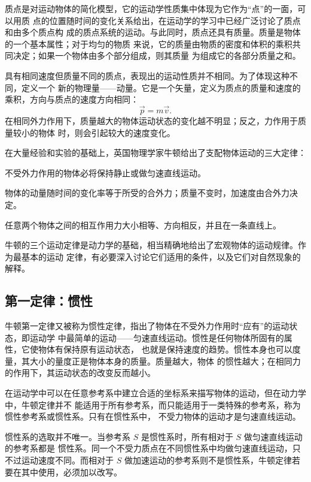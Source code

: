 {质点是对运动物体的简化模型，它的运动学性质集中体现为它作为“点”的一面，可以用质
点的位置随时间的变化关系给出，在运动学的学习中已经广泛讨论了质点和由多个质点构
成的质点系统的运动。与此同时，质点还具有质量。质量是物体的一个基本属性；对于均匀的物质
来说，它的质量由物质的密度和体积的乘积共同决定；如果一个物体由多个部分组成，则其质量
为组成它的各部分质量之和。

具有相同速度但质量不同的质点，表现出的运动性质并不相同。为了体现这种不同，定义一个
新的物理量——动量。它是一个矢量，定义为质点的质量和速度的乘积，方向与质点的速度方向相同：
\begin{equation}
  \vec p=m\vec v.
\end{equation}
在相同外力作用下，质量越大的物体运动状态的变化越不明显；反之，力作用于质量较小的物体
时，则会引起较大的速度变化。

在大量经验和实验的基础上，英国物理学家牛顿给出了支配物体运动的三大定律：
\begin{description}[style=nextline,leftmargin=2em,labelindent=0pt]
  \item[第一定律]不受外力作用的物体必将保持静止或做匀速直线运动。
  \item[第二定律]物体的动量随时间的变化率等于所受的合外力；质量不变时，加速度由合外力决定。
  \item[第三定律]任意两个物体之间的相互作用力大小相等、方向相反，并且在一条直线上。
\end{description}
牛顿的三个运动定律是动力学的基础，相当精确地给出了宏观物体的运动规律。作为最基本的运动
定律，有必要深入讨论它们适用的条件，以及它们对自然现象的解释。

\subsection{第一定律：惯性}

牛顿第一定律又被称为惯性定律，指出了物体在不受外力作用时“应有”的运动状态，即运动学
中最简单的运动——匀速直线运动。惯性是任何物体所固有的属性，它使物体有保持原有运动状态，
也就是保持速度的趋势。惯性本身也可以度量，其大小的量度正是物体本身的质量。质量越大，物体
的惯性越大；在相同力的作用下，其运动状态的改变反而越小。

在运动学中可以在任意参考系中建立合适的坐标系来描写物体的运动，但在动力学中，牛顿定律并不
能适用于所有参考系，而只能适用于一类特殊的参考系，称为惯性参考系或惯性系。只有在惯性系中，
不受力物体的运动才是匀速直线运动。

惯性系的选取并不唯一。当参考系 $S$ 是惯性系时，所有相对于 $S$ 做匀速直线运动的参考系都是
惯性系。同一个不受力质点在不同惯性系中均做匀速直线运动，只不过运动速度不同。而相对于
$S$ 做加速运动的参考系则不是惯性系，牛顿定律若要在其中使用，必须加以改写。

}
